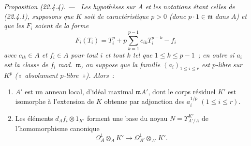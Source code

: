 \documentclass[10pt,oneside]{book}
\makeatletter
\newcommand{\setmanualcurrentlabel}[1]{\def\@currentlabel{#1}}
\newcommand{\oldpage}[2][]{%
  \setcounter{footnote}{0}%
  \marginpar{\scriptsize\textbf{#1}~|~#2}\ignorespaces}
\newenvironment{proposition}[1][]{%
  \setmanualcurrentlabel{#1}\par\medskip\noindent\itshape Proposition (#1). ---\ }{\par}
\makeatother
\begin{document}
\begin{proposition}[22.4.4]
\label{0.22.4.4-fr}
Les hypothèses sur $A$ et les notations étant celles de (22.4.1), supposons
que $K$ soit de caractéristique $p>0$ (donc $p\cdot1\in\mathfrak m$ dans
$A$) et que les $F_i$ soient de la forme
\begin{equation}
\label{0.22.4.4.1-fr}
  F_i(T_i)=T_i^p+p\sum_{k=1}^{p-1}c_{ik}T_i^{p-k}-f_i
  \tag{22.4.4.1}
\end{equation}
avec $c_{ik}\in A$ et $f_i\in A$ pour tout $i$ et tout $k$ tel que
$1\leqslant k\leqslant p-1$~; en outre si $a_i$ est la classe de $f_i$
mod.~$\mathfrak m$, on suppose que la famille $(a_i)_{1\leqslant i\leqslant r}$
est $p$-libre sur $K^p$ («~absolument $p$-libre~»). Alors~:
\begin{enumerate}
  \item[(i)] $A'$ est un anneau local, d'idéal maximal $\mathfrak mA'$,
  dont le corps résiduel $K'$ est isomorphe à l'extension de $K$ obtenue par
  adjonction des $a_i^{1/p}$ $(1\leqslant i\leqslant r)$.

  \oldpage[0\textsubscript{IV-1}]{195}

  \item[(ii)] Les éléments $d_Af_i\otimes1_{K'}$ forment une base du noyau
  $N=\Upsilon^{K'}_{A'/A}$ de l'homomorphisme canonique
  \[
    \Omega^1_A\otimes_AK'\longrightarrow
    \Omega^1_{A'}\otimes_{A'}K'.
  \]
\end{enumerate}
\end{proposition}
\end{document}
